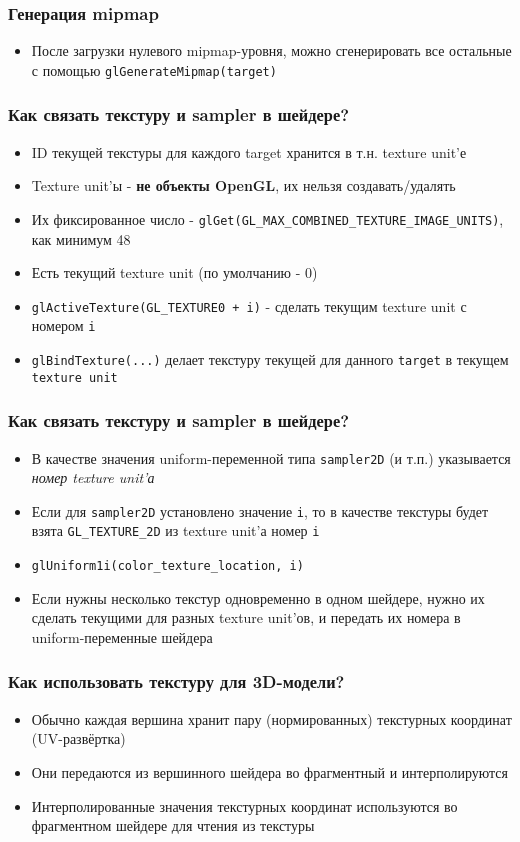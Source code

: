 \documentclass{beamer}
\begin{document}
\begin{frame}[fragile]
\frametitle{Генерация mipmap}
\begin{itemize}
\item После загрузки нулевого mipmap-уровня, можно сгенерировать все остальные с помощью \verb|glGenerateMipmap(target)|
\end{itemize}
\end{frame}

\begin{frame}[fragile]
\frametitle{Как связать текстуру и sampler в шейдере?}
\begin{itemize}
\item ID текущей текстуры для каждого target хранится в т.н. texture unit'е
\item Texture unit'ы - \textbf{не объекты OpenGL}, их нельзя создавать/удалять
\item Их фиксированное число - \verb|glGet(GL_MAX_COMBINED_TEXTURE_IMAGE_UNITS)|, как минимум 48
\item Есть текущий texture unit (по умолчанию - 0)
\item \verb|glActiveTexture(GL_TEXTURE0 + i)| - сделать текущим texture unit с номером \verb|i|
\item \verb|glBindTexture(...)| делает текстуру текущей для данного \verb|target| в текущем \verb|texture unit|
\end{itemize}
\end{frame}

\begin{frame}[fragile]
\frametitle{Как связать текстуру и sampler в шейдере?}
\begin{itemize}
\item В качестве значения uniform-переменной типа \verb|sampler2D| (и т.п.) указывается \textit{номер texture unit'а}
\pause
\item Если для \verb|sampler2D| установлено значение \verb|i|, то в качестве текстуры будет взята \verb|GL_TEXTURE_2D| из texture unit'а номер \verb|i|
\pause
\item \verb|glUniform1i(color_texture_location, i)|
\pause
\item Если нужны несколько текстур одновременно в одном шейдере, нужно их сделать текущими для разных texture unit'ов, и передать их номера в uniform-переменные шейдера
\end{itemize}
\end{frame}

\begin{frame}[fragile]
\frametitle{Как использовать текстуру для 3D-модели?}
\begin{itemize}
\item Обычно каждая вершина хранит пару (нормированных) текстурных координат (UV-развёртка)
\pause
\item Они передаются из вершинного шейдера во фрагментный и интерполируются
\pause
\item Интерполированные значения текстурных координат используются во фрагментном шейдере для чтения из текстуры
\end{itemize}
\end{frame}
\end{document}
